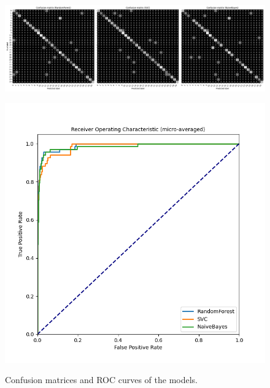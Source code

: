 \documentclass{article}
\begin{document}
\begin{figure}[h]
    \centering
    \begin{minipage}{0.735\textwidth}
        \centering
        \includegraphics[width=\textwidth]{confusion_matrices.png}
        \label{fig:confusion_matrices}
    \end{minipage}\hfill
    \begin{minipage}{0.265\textwidth}
        \centering
        \includegraphics[width=\textwidth]{roc_curves.png}
        \label{fig:roc_curves}
    \end{minipage}
    \caption{
        Confusion matrices and ROC curves of the models.
    }
    \label{fig:results}
\end{figure}
\end{document}
